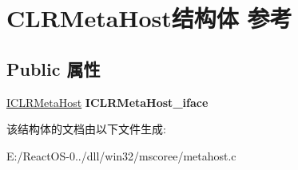 \hypertarget{struct_c_l_r_meta_host}{}\section{C\+L\+R\+Meta\+Host结构体 参考}
\label{struct_c_l_r_meta_host}
\subsection*{Public 属性}
\begin{DoxyCompactItemize}
\item 
\mbox{\label{struct_c_l_r_meta_host_a9a7ba91061b2a18e5008361ab7bdb35f}} 
\hyperlink{interface_i_c_l_r_meta_host}{I\+C\+L\+R\+Meta\+Host} {\bfseries I\+C\+L\+R\+Meta\+Host\+\_\+iface}
\end{DoxyCompactItemize}


该结构体的文档由以下文件生成\+:\begin{DoxyCompactItemize}
\item 
E\+:/\+React\+O\+S-\/0../dll/win32/mscoree/metahost.\+c\end{DoxyCompactItemize}
